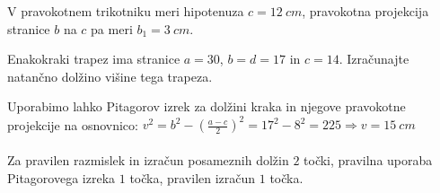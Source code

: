 \documentclass[addpoints]{exam}
\begin{document}
\begin{questions}

    \question
    V pravokotnem trikotniku meri hipotenuza $c=12~cm$, pravokotna projekcija stranice $b$ na $c$ pa meri $b_1=3~cm$.






    \newpage

    \question[4]
    Enakokraki trapez ima stranice $a=30$, $b=d=17$ in $c=14$. Izračunajte natančno dolžino višine tega trapeza.


    \begin{solution}[11cm]
        Uporabimo lahko Pitagorov izrek za dolžini kraka in njegove pravokotne projekcije na osnovnico: $v^2=b^2-\left(\frac{a-c}{2}\right)^2=17^2-8^2=225 \Rightarrow v=15~cm$ \\ \\
        Za pravilen razmislek in izračun posameznih dolžin $2$ točki, pravilna uporaba Pitagorovega izreka $1$ točka, pravilen izračun $1$ točka.
    \end{solution}




\end{questions}
\end{document}
